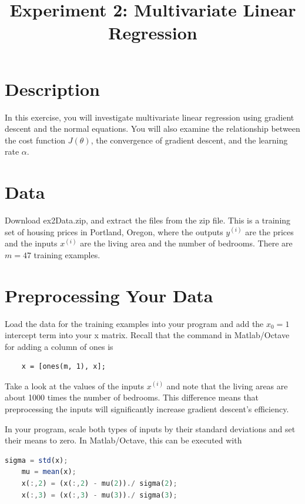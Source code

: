 \documentclass[10pt,a4paper]{article}
\begin{document}
\title{Experiment 2: Multivariate Linear Regression}

\maketitle
  
\section{Description}
%
  In this exercise, you will investigate multivariate linear regression using gradient descent and the normal equations. You will also examine the relationship between the cost function $J(\theta)$, the convergence of gradient descent, and the learning rate $\alpha$.




\section{Data}
%
  Download ex2Data.zip, and extract the files from the zip file. This is a training set of housing prices in Portland, Oregon, where the outputs $y^{(i)}$ are the prices and the inputs $x^{(i)}$ are the living area and the number of bedrooms. There are $m=47$ training examples.




\section{Preprocessing Your Data}
%
  Load the data for the training examples into your program and add the $x_0 = 1$ intercept term into your x matrix. Recall that the command in Matlab/Octave for adding a column of ones is
  \begin{lstlisting}
    x = [ones(m, 1), x];
  \end{lstlisting}
  
  Take a look at the values of the inputs $x^{(i)}$ and note that the living areas are about 1000 times the number of bedrooms. This difference means that preprocessing the inputs will significantly increase gradient descent's efficiency.

  In your program, scale both types of inputs by their standard deviations and set their means to zero. In Matlab/Octave, this can be executed with
  \begin{lstlisting}[language=Octave, basicstyle=\footnotesize, showspaces=false]
    sigma = std(x);
    mu = mean(x);
    x(:,2) = (x(:,2) - mu(2))./ sigma(2);
    x(:,3) = (x(:,3) - mu(3))./ sigma(3);
  \end{lstlisting}
\end{document}
